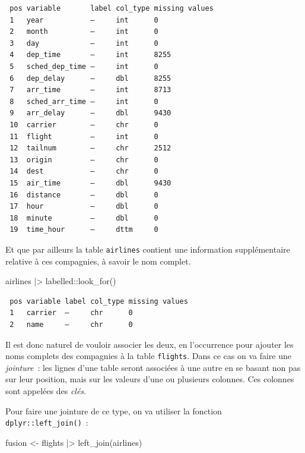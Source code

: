\documentclass[
  letterpaper,
  DIV=11,
  numbers=noendperiod,
  oneside]{scrreprt}
\newenvironment{Shaded}{\begin{snugshade}}{\end{snugshade}}
\newcommand{\FunctionTok}[1]{\textcolor[rgb]{0.28,0.35,0.67}{#1}}
\newcommand{\NormalTok}[1]{\textcolor[rgb]{0.00,0.23,0.31}{#1}}
\newcommand{\OtherTok}[1]{\textcolor[rgb]{0.00,0.23,0.31}{#1}}
\newcommand{\SpecialCharTok}[1]{\textcolor[rgb]{0.37,0.37,0.37}{#1}}
\begin{document}
\begin{verbatim}
 pos variable       label col_type missing values
 1   year           —     int      0             
 2   month          —     int      0             
 3   day            —     int      0             
 4   dep_time       —     int      8255          
 5   sched_dep_time —     int      0             
 6   dep_delay      —     dbl      8255          
 7   arr_time       —     int      8713          
 8   sched_arr_time —     int      0             
 9   arr_delay      —     dbl      9430          
 10  carrier        —     chr      0             
 11  flight         —     int      0             
 12  tailnum        —     chr      2512          
 13  origin         —     chr      0             
 14  dest           —     chr      0             
 15  air_time       —     dbl      9430          
 16  distance       —     dbl      0             
 17  hour           —     dbl      0             
 18  minute         —     dbl      0             
 19  time_hour      —     dttm     0             
\end{verbatim}

Et que par ailleurs la table \texttt{airlines} contient une information
supplémentaire relative à ces compagnies, à savoir le nom complet.

\begin{Shaded}
\begin{Highlighting}[]
\NormalTok{airlines }\SpecialCharTok{|\textgreater{}}\NormalTok{ labelled}\SpecialCharTok{::}\FunctionTok{look\_for}\NormalTok{()}
\end{Highlighting}
\end{Shaded}

\begin{verbatim}
 pos variable label col_type missing values
 1   carrier  —     chr      0             
 2   name     —     chr      0             
\end{verbatim}

Il est donc naturel de vouloir associer les deux, en l'occurrence pour
ajouter les noms complets des compagnies à la table \texttt{flights}.
Dans ce cas on va faire une \emph{jointure}~: les lignes d'une table
seront associées à une autre en se basant non pas sur leur position,
mais sur les valeurs d'une ou plusieurs colonnes. Ces colonnes sont
appelées des \emph{clés}.

Pour faire une jointure de ce type, on va utiliser la fonction
\texttt{dplyr::left\_join()}~:

\begin{Shaded}
\begin{Highlighting}[]
\NormalTok{fusion }\OtherTok{\textless{}{-}}\NormalTok{ flights }\SpecialCharTok{|\textgreater{}} \FunctionTok{left\_join}\NormalTok{(airlines)}
\end{Highlighting}
\end{Shaded}
\end{document}
